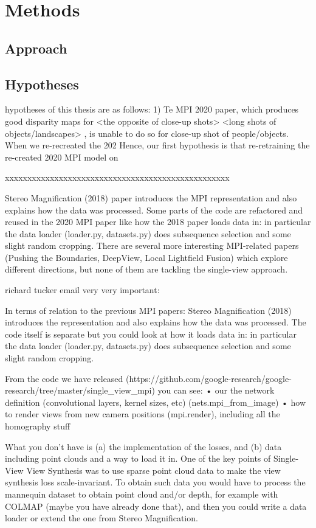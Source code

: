 \chapter{Methods}\label{ch2:methods}

\section{Approach}\label{sec1:approach} 

\section{Hypotheses}

 hypotheses of this thesis are as follows:
1) Te MPI 2020 paper, which produces good disparity maps for <the opposite of close-up shots> <long shots of objects/landscapes> \cite{}, is unable to do so for close-up shot of people/objects. When we re-recreated the 202 Hence, our first hypothesis is that re-retraining the re-created 2020 MPI model on  


xxxxxxxxxxxxxxxxxxxxxxxxxxxxxxxxxxxxxxxxxxxxxxxxxx

Stereo Magnification (2018) paper introduces the MPI representation and also explains how the data was processed. Some parts of the code are refactored and reused in the 2020 MPI paper like how the 2018 paper loads data in: in particular the data loader (loader.py, datasets.py) does subsequence selection and some slight random cropping. There are several more interesting MPI-related papers (Pushing the Boundaries, DeepView, Local Lightfield Fusion) which explore different directions, but none of them are tackling the single-view approach.

richard tucker email very very important:

In terms of relation to the previous MPI papers: Stereo Magnification (2018) introduces the representation and also explains how the data was processed. The code itself is separate but you could look at how it loads data in: in particular the data loader (loader.py, datasets.py) does subsequence selection and some slight random cropping.

From the code we have released (https://github.com/google-research/google-research/tree/master/single_view_mpi) you can see:
  • our the network definition (convolutional layers, kernel sizes, etc) (nets.mpi_from_image)
  • how to render views from new camera positions (mpi.render), including all the homography stuff

What you don't have is (a) the implementation of the losses, and (b) data including point clouds and a way to load it in.
One of the key points of Single-View View Synthesis was to use sparse point cloud data to make the view synthesis loss scale-invariant. To obtain such data you would have to process the mannequin dataset to obtain point cloud and/or depth, for example with COLMAP (maybe you have already done that), and then you could write a data loader or extend the one from Stereo Magnification.

